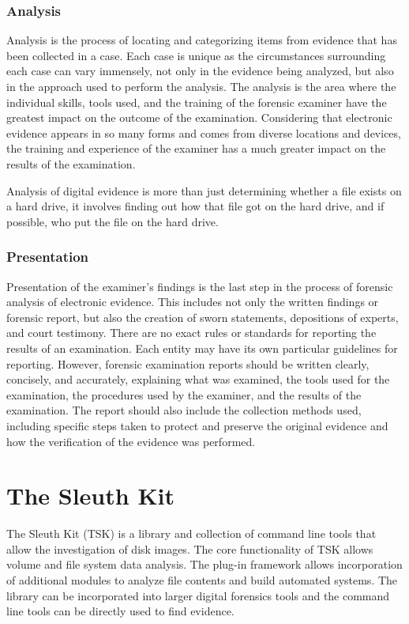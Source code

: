 \subsubsection{Analysis}

Analysis is the process of locating and categorizing items from evidence
that has been collected in a case. Each case is unique as the
circumstances surrounding each case can vary immensely, not only in the evidence being analyzed, but also in the
approach used to perform the analysis. The analysis is the area where
the individual skills, tools used, and the training of the forensic examiner have
the greatest impact on the outcome of the examination. Considering that electronic evidence
appears in so many forms and comes from diverse locations and devices,
the training and experience of the examiner has a much greater impact
on the results of the examination.

Analysis of digital evidence is more than just determining whether a file exists on a hard drive, it involves finding out how
that file got on the hard drive, and if possible, who put the file on the hard drive.

\subsubsection{Presentation}

Presentation of the examiner's findings is the last step in the process of forensic
analysis of electronic evidence. This includes not only the written findings or forensic
report, but also the creation of sworn statements, depositions of experts, and court testimony.
There are no exact rules or standards for reporting the results of an
examination. Each entity may have its own particular guidelines
for reporting. However, forensic examination reports should be written clearly, concisely,
and accurately, explaining what was examined, the tools used for the examination,
the procedures used by the examiner, and the results of the examination.
The report should also include the collection methods used, including specific steps
taken to protect and preserve the original evidence and how the verification of the
evidence was performed.

\section{The Sleuth Kit}

The Sleuth Kit (TSK) is a library and collection of command line tools that allow the
investigation of disk images. The core functionality of TSK allows volume and file system data analysis.
The plug-in framework allows incorporation of additional modules to analyze file contents
and build automated systems. The library can be incorporated into larger digital forensics tools and
the command line tools can be directly used to find evidence.

